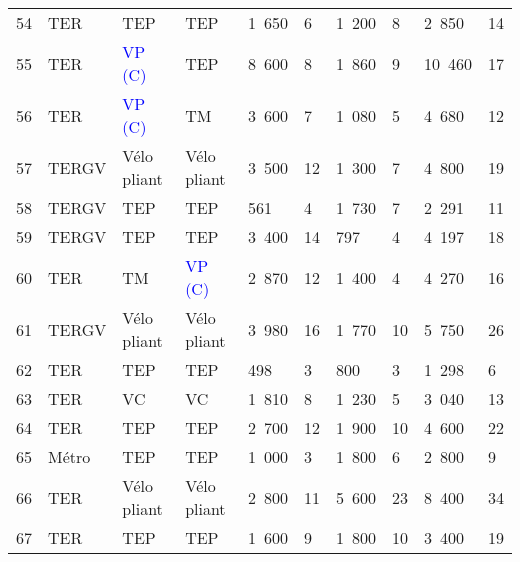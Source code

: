 \begin{longtable}{p{0.7cm}p{1.4cm}p{1.4cm}p{1.6cm}p{0.8cm}p{0.8cm}p{0.8cm}p{0.8cm}p{1.1cm}p{1.1cm}}
    \small{54} & \small{TER} & \small{TEP} & \small{TEP} & \small{1~650} & \small{6} & \small{1~200} & \small{8} & \small{2~850} & \small{14} \\
    \small{55} & \small{TER} & \textcolor{blue}{\small{VP (C)}} & \small{TEP} & \small{8~600} & \small{8} & \small{1~860} & \small{9} & \small{10~460} & \small{17} \\
    \small{56} & \small{TER} & \textcolor{blue}{\small{VP (C)}} & \small{TM} & \small{3~600} & \small{7} & \small{1~080} & \small{5} & \small{4~680} & \small{12} \\
    \small{57} & \small{TERGV} & \small{Vélo pliant} & \small{Vélo pliant} & \small{3~500} & \small{12} & \small{1~300} & \small{7} & \small{4~800} & \small{19} \\
    \small{58} & \small{TERGV} & \small{TEP} & \small{TEP} & \small{561} & \small{4} & \small{1~730} & \small{7} & \small{2~291} & \small{11} \\
    \small{59} & \small{TERGV} & \small{TEP} & \small{TEP} & \small{3~400} & \small{14} & \small{797} & \small{4} & \small{4~197} & \small{18} \\
    \small{60} & \small{TER} & \small{TM} & \textcolor{blue}{\small{VP (C)}} & \small{2~870} & \small{12} & \small{1~400} & \small{4} & \small{4~270} & \small{16} \\
    \small{61} & \small{TERGV} & \small{Vélo pliant} & \small{Vélo pliant} & \small{3~980} & \small{16} & \small{1~770} & \small{10} & \small{5~750} & \small{26} \\
    \small{62} & \small{TER} & \small{TEP} & \small{TEP} & \small{498} & \small{3} & \small{800} & \small{3} & \small{1~298} & \small{6} \\
    \small{63} & \small{TER} & \small{VC} & \small{VC} & \small{1~810} & \small{8} & \small{1~230} & \small{5} & \small{3~040} & \small{13} \\
    \small{64} & \small{TER} & \small{TEP} & \small{TEP} & \small{2~700} & \small{12} & \small{1~900} & \small{10} & \small{4~600} & \small{22} \\
    \small{65} & \small{Métro} & \small{TEP} & \small{TEP} & \small{1~000} & \small{3} & \small{1~800} & \small{6} & \small{2~800} & \small{9} \\
    \small{66} & \small{TER} & \small{Vélo pliant} & \small{Vélo pliant} & \small{2~800} & \small{11} & \small{5~600} & \small{23} & \small{8~400} & \small{34} \\
    \small{67} & \small{TER} & \small{TEP} & \small{TEP} & \small{1~600} & \small{9} & \small{1~800} & \small{10} & \small{3~400} & \small{19} \\

\end{longtable}
